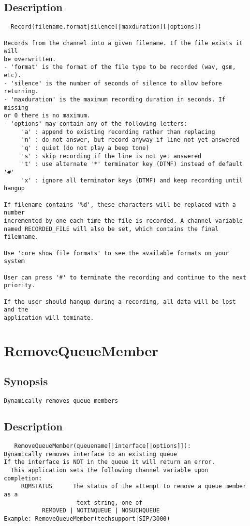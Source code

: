 \subsection{Description}
\begin{verbatim}
  Record(filename.format|silence[|maxduration][|options])

Records from the channel into a given filename. If the file exists it will
be overwritten.
- 'format' is the format of the file type to be recorded (wav, gsm, etc).
- 'silence' is the number of seconds of silence to allow before returning.
- 'maxduration' is the maximum recording duration in seconds. If missing
or 0 there is no maximum.
- 'options' may contain any of the following letters:
     'a' : append to existing recording rather than replacing
     'n' : do not answer, but record anyway if line not yet answered
     'q' : quiet (do not play a beep tone)
     's' : skip recording if the line is not yet answered
     't' : use alternate '*' terminator key (DTMF) instead of default '#'
     'x' : ignore all terminator keys (DTMF) and keep recording until hangup

If filename contains '%d', these characters will be replaced with a number
incremented by one each time the file is recorded. A channel variable
named RECORDED_FILE will also be set, which contains the final filemname.

Use 'core show file formats' to see the available formats on your system

User can press '#' to terminate the recording and continue to the next priority.

If the user should hangup during a recording, all data will be lost and the
application will teminate. 

\end{verbatim}


\section{RemoveQueueMember}
\subsection{Synopsis}
\begin{verbatim}
Dynamically removes queue members
\end{verbatim}
\subsection{Description}
\begin{verbatim}
   RemoveQueueMember(queuename[|interface[|options]]):
Dynamically removes interface to an existing queue
If the interface is NOT in the queue it will return an error.
  This application sets the following channel variable upon completion:
     RQMSTATUS      The status of the attempt to remove a queue member as a
                     text string, one of
           REMOVED | NOTINQUEUE | NOSUCHQUEUE 
Example: RemoveQueueMember(techsupport|SIP/3000)

\end{verbatim}


